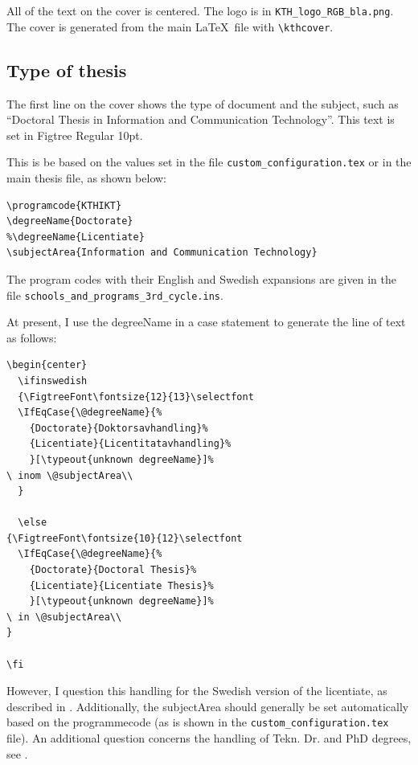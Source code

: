 \documentclass[12pt, twoside]{article}
\newif\ifinswedish
\begin{document}
All of the text on the cover is centered. The logo is in \texttt{KTH\_logo\_RGB\_bla.png}. The cover is generated from the main \LaTeX\ file with \texttt{\textbackslash kthcover}.

\subsection{Type of thesis}
\label{sec:cycleTypeofThesis}
The first line on the cover shows the type of document and the subject, such as \enquote{Doctoral Thesis in Information and Communication Technology}. This text is set in Figtree Regular 10pt.

This is be based on the values set in the file \texttt{custom\_configuration.tex} or in the main thesis file, as shown below:

\begin{lstlisting}[style=latexExampleForAuthors]
\programcode{KTHIKT}
\degreeName{Doctorate}
%\degreeName{Licentiate}
\subjectArea{Information and Communication Technology}
\end{lstlisting}

The program codes with their English and Swedish expansions are given in the file \texttt{schools\_and\_programs\_3rd\_cycle.ins}.

At present, I use the degreeName in a case statement to generate the line of text as follows:
\begin{lstlisting}[style=latexExampleForAuthors]
\begin{center}
  \ifinswedish
  {\FigtreeFont\fontsize{12}{13}\selectfont 
  \IfEqCase{\@degreeName}{%
    {Doctorate}{Doktorsavhandling}%
    {Licentiate}{Licentitatavhandling}%
    }[\typeout{unknown degreeName}]%
\ inom \@subjectArea\\
  }

  \else
{\FigtreeFont\fontsize{10}{12}\selectfont
  \IfEqCase{\@degreeName}{%
    {Doctorate}{Doctoral Thesis}%
    {Licentiate}{Licentiate Thesis}%
    }[\typeout{unknown degreeName}]%
\ in \@subjectArea\\
}

\fi
\end{lstlisting}

However, I question this handling for the Swedish version of the licentiate, as described in  .
Additionally, the subjectArea should generally be set automatically based on the programmecode (as is shown in the \texttt{custom\_configuration.tex} file).
An additional question concerns the handling of Tekn. Dr. and PhD degrees, see .
\end{document}
